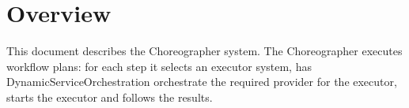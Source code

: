 \documentclass[a4paper]{arrowhead}
\begin{document}
\sloppy

\ArrowheadSetup

\begin{center}
  \vspace*{1cm}
  \huge{\arrowtitle}

  \vspace*{0.2cm}
  \LARGE{\arrowtype}
  \vspace*{1cm}

  \vspace*{\fill}


  \vspace*{1cm}
  \vspace*{\fill}

  \begin{abstract}
    This document describes the Choreographer support system of the Eclipse Arrowhead 5.2.2 framework, as implemented in \texttt{ah5-Choreographer-java-spring} of the primary Java source tree (\texttt{Eclipse-Arrowhead-java}) and deployed with the standalone Compose definition of that folder.
  \end{abstract}

  \vspace*{1cm}
\end{center}

\newpage

\tableofcontents
\newpage

\section{Overview}
\label{sec:overview}

This document describes the Choreographer system. The Choreographer executes workflow plans: for each step it selects an executor system, has Dynamic\allowbreak{}Service\allowbreak{}Orchestration orchestrate the required provider for the executor, starts the executor and follows the results.
\end{document}
